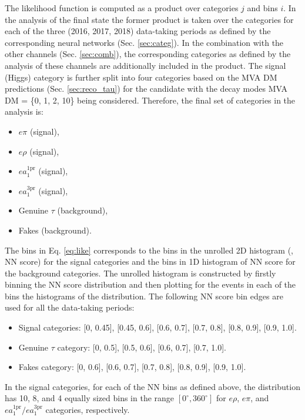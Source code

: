 The likelihood function is computed as a product over categories $j$ and bins $i$. In the analysis of the \et final state the former product is taken over the categories for each of the three (2016, 2017, 2018) data-taking periods as defined by the corresponding neural networks (Sec. \ref{sec:categ}). In the combination with the other channels (Sec. \ref{sec:comb}), the corresponding categories as defined by the analysis of these channels are additionally included in the product. The signal (Higgs) category is further split into four categories based on the MVA DM predictions (Sec. \ref{sec:reco_tau}) for the \tauh candidate with the decay modes MVA DM = \{0, 1, 2, 10\} being considered. Therefore, the final set of categories in the \et analysis is:
\begin{itemize}
    \item $e\pi$ (signal),
    \item $e\rho$ (signal),
    \item $e a_1^\text{1pr}$ (signal),
    \item $e a_1^\text{3pr}$ (signal),
    \item Genuine $\tau$ (background),
    \item Fakes (background).
\end{itemize}

The bins in Eq. \ref{eq:like} corresponds to the bins in the unrolled 2D histogram (\phicp, NN score) for the signal categories and the bins in 1D histogram of NN score for the background categories. The unrolled histogram is constructed by firstly binning the NN score distribution and then plotting for the events in each of the bins the histograms of the \phicp distribution. The following NN score bin edges are used for all the data-taking periods:
\begin{itemize}
    \item Signal categories: [0, 0.45], [0.45, 0.6], [0.6, 0.7], [0.7, 0.8], [0.8, 0.9], [0.9, 1.0].
    \item Genuine $\tau$ category: [0, 0.5], [0.5, 0.6], [0.6, 0.7], [0.7, 1.0].
    \item Fakes category: [0, 0.6], [0.6, 0.7], [0.7, 0.8], [0.8, 0.9], [0.9, 1.0].
\end{itemize}

In the signal categories, for each of the NN bins as defined above, the \phicp distribution has 10, 8, and 4 equally sized bins in the range $[0^\circ, 360^\circ]$ for $e\rho$, $e\pi$, and $e a_1^\text{1pr}/e a_1^\text{3pr}$ categories, respectively.

